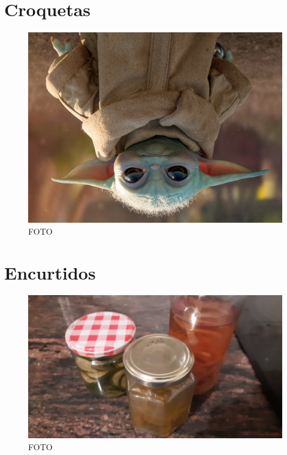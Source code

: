 \documentclass[
]{book}
\begin{document}
\hypertarget{croquetas}{%
\chapter{Croquetas}\label{croquetas}}

\begin{figure}
\centering
\includegraphics{images/grogu.png}
\caption{FOTO}
\end{figure}

\hypertarget{encurtidos}{%
\chapter{Encurtidos}\label{encurtidos}}

\begin{figure}
\centering
\includegraphics{images/encurtidos.jpg}
\caption{FOTO}
\end{figure}
\end{document}
